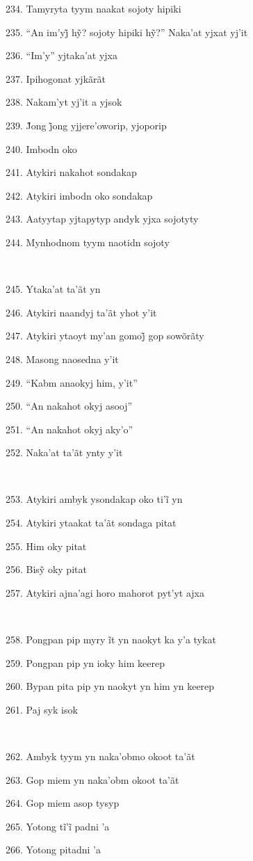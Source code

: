 234. Tamyryta tyym naakat sojoty hipiki

235. ``An im’yj̃ hỹ? sojoty hipiki hỹ?'' Naka’at yjxat yj’it

236. ``Im'y'' yjtaka'at yjxa

237. Ipihogonat yjkãrãt

238. Nakam'yt yj'it a yjsok

239. J̃ong j̃ong yjjere’oworip, yjoporip

240. Imbodn oko

241. Atykiri nakahot sondakap

242. Atykiri imbodn oko sondakap

243. Aatyytap yjtapytyp andyk yjxa sojotyty

244. Mynhodnom tyym naotidn sojoty

~

245. Ytaka'at ta'ãt yn

246. Atykiri naandyj ta'ãt yhot y'it

247. Atykiri ytaoyt my’an gomoj̃ gop sowõrãty

248. Masong naosedna y'it

249. ``Kabm anaokyj him, y'it''

250. ``An nakahot okyj asooj''

251. ``An nakahot okyj aky'o''

252. Naka'at ta'ãt ynty y'it

~

253. Atykiri ambyk ysondakap oko ti’ĩ yn

254. Atykiri ytaakat ta'ãt sondaga pitat

255. Him oky pitat

256. Bisỹ oky pitat

257. Atykiri ajna'agi horo mahorot pyt'yt ajxa

~

258. Pongpan pip myry ĩt yn naokyt ka y’a tykat

259. Pongpan pip yn ioky him keerep

260. Bypan pita pip yn naokyt yn him yn keerep

261. Paj syk isok

~

262. Ambyk tyym yn naka'obmo okoot ta'ãt

263. Gop miem yn naka'obm okoot ta'ãt

264. Gop miem asop tysyp

265. Yotong tĩ’ĩ padni ’a

266. Yotong pitadni 'a

